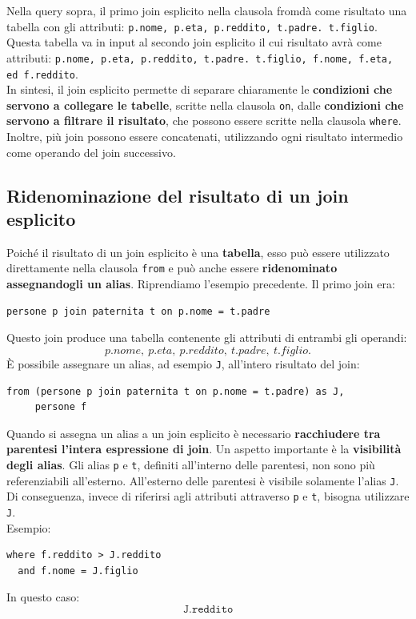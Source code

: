 Nella query sopra, il primo join esplicito nella clausola fromdà come risultato
una tabella con gli attributi: \texttt{p.nome, p.eta, p.reddito, t.padre. t.figlio}. Questa
tabella va in input al secondo join esplicito il cui risultato avrà come attributi:
\texttt{p.nome, p.eta, p.reddito, t.padre. t.figlio, f.nome, f.eta, ed f.reddito}.\\
In sintesi, il join esplicito permette di separare chiaramente le \textbf{condizioni che servono a collegare le tabelle}, scritte nella clausola \texttt{on}, dalle \textbf{condizioni che servono a filtrare il risultato}, che possono essere scritte nella clausola \texttt{where}. Inoltre, più join possono essere concatenati, utilizzando ogni risultato intermedio come operando del join successivo.
\subsection{Ridenominazione del risultato di un join esplicito}
Poiché il risultato di un join esplicito è una \textbf{tabella}, esso può essere utilizzato direttamente nella clausola \texttt{from} e può anche essere \textbf{ridenominato assegnandogli un alias}.
Riprendiamo l'esempio precedente. Il primo join era:
\begin{verbatim}
persone p join paternita t on p.nome = t.padre
\end{verbatim}
\noindent Questo join produce una tabella contenente gli attributi di entrambi gli operandi:
\[
p.nome,\ p.eta,\ p.reddito,\ t.padre,\ t.figlio.
\]
\noindent È possibile assegnare un alias, ad esempio \texttt{J}, all'intero risultato del join:
\begin{verbatim}
from (persone p join paternita t on p.nome = t.padre) as J,
     persone f
\end{verbatim}
\noindent Quando si assegna un alias a un join esplicito è necessario \textbf{racchiudere tra parentesi l'intera espressione di join}.
Un aspetto importante è la \textbf{visibilità degli alias}. Gli alias \texttt{p} e \texttt{t}, definiti all'interno delle parentesi, non sono più
referenziabili all'esterno. All'esterno delle parentesi è visibile solamente l'alias \texttt{J}.
Di conseguenza, invece di riferirsi agli attributi attraverso \texttt{p} e \texttt{t}, bisogna utilizzare \texttt{J}.\\ 
\textcolor{verdeEsempio}{Esempio:}
\begin{verbatim}
where f.reddito > J.reddito
  and f.nome = J.figlio
\end{verbatim}
\noindent In questo caso:
\[
\texttt{J.reddito}
\]


